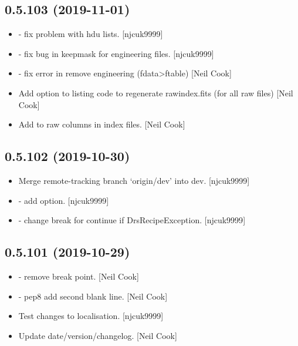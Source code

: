 \documentclass[a4paper,10pt,english]{report}
\begin{document}
\subsection{0.5.103 (2019-11-01)}
\label{\detokenize{misc/changelog:id39}}\begin{itemize}
\item {} 
 - fix problem with hdu lists. {[}njcuk9999{]}

\item {} 
 - fix bug in keepmask for
engineering files. {[}njcuk9999{]}

\item {} 
 - fix error in remove engineering (fdata\textendash{}\textgreater{}ftable)
{[}Neil Cook{]}

\item {} 
Add option to listing code to regenerate rawindex.fits (for all raw
files) {[}Neil Cook{]}

\item {} 
Add  to raw columns in index files. {[}Neil Cook{]}

\end{itemize}


\subsection{0.5.102 (2019-10-30)}
\label{\detokenize{misc/changelog:id40}}\begin{itemize}
\item {} 
Merge remote-tracking branch ‘origin/dev’ into dev. {[}njcuk9999{]}

\item {} 
 - add  option.
{[}njcuk9999{]}

\item {} 
 - change break for continue if
DrsRecipeException. {[}njcuk9999{]}

\end{itemize}


\subsection{0.5.101 (2019-10-29)}
\label{\detokenize{misc/changelog:id41}}\begin{itemize}
\item {} 
 - remove break point. {[}Neil Cook{]}

\item {} 
 - pep8 add second blank line. {[}Neil
Cook{]}

\item {} 
Test changes to localisation. {[}njcuk9999{]}

\item {} 
Update date/version/changelog. {[}Neil Cook{]}

\end{itemize}
\end{document}
